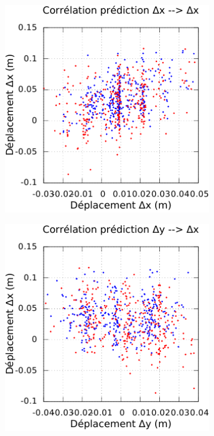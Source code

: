 \begin{figure}[htbp]
    \centerfloat
    \begin{subfigure}{0.22\paperwidth}
        \centering
        \includegraphics[type=pdf,ext=.pdf,read=.pdf,width=1.0\linewidth]{../plot/OdometryLWPR/grass_close_function_goal_x_x}
    \end{subfigure}
    \begin{subfigure}{0.22\paperwidth}
        \centering
        \includegraphics[type=pdf,ext=.pdf,read=.pdf,width=1.0\linewidth]{../plot/OdometryLWPR/grass_close_function_goal_y_x}

\end{subfigure}
\end{figure}
